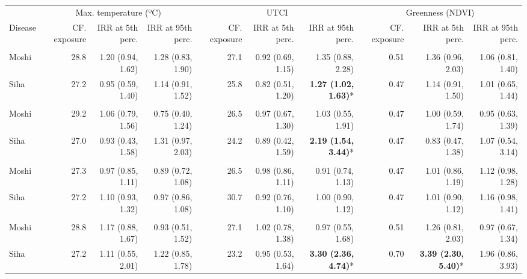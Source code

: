 \begin{table}[t]
\fontsize{12.0pt}{14.4pt}\selectfont
\begin{tabular*}{\linewidth}{@{\extracolsep{\fill}}l|rrrrrrrrr}
\toprule
 & \multicolumn{3}{c}{Max. temperature (ºC)} & \multicolumn{3}{c}{UTCI} & \multicolumn{3}{c}{Greenness (NDVI)} \\ 
\cmidrule(lr){2-4} \cmidrule(lr){5-7} \cmidrule(lr){8-10}
Disease & CF. exposure & IRR at 5th perc. & IRR at 95th perc. & CF. exposure & IRR at 5th perc. & IRR at 95th perc. & CF. exposure & IRR at 5th perc. & IRR at 95th perc. \\ 
\midrule\addlinespace[2.5pt]
\multicolumn{10}{l}{Pneumonia, Severe} \\[2.5pt] 
\midrule\addlinespace[2.5pt]
Moshi & 28.8 & 1.20 (0.94, 1.62) & 1.28 (0.83, 1.90) & 27.1 & 0.92 (0.69, 1.15) & 1.35 (0.88, 2.28) & 0.51 & 1.36 (0.96, 2.03) & 1.06 (0.81, 1.40) \\ 
Siha & 27.2 & 0.95 (0.59, 1.40) & 1.14 (0.91, 1.52) & 25.8 & 0.82 (0.51, 1.20) & \textbf{1.27 (1.02, 1.63)}* & 0.47 & 1.14 (0.91, 1.50) & 1.01 (0.65, 1.44) \\ 
\midrule\addlinespace[2.5pt]
\multicolumn{10}{l}{Tuberculosis} \\[2.5pt] 
\midrule\addlinespace[2.5pt]
Moshi & 29.2 & 1.06 (0.79, 1.56) & 0.75 (0.40, 1.24) & 26.5 & 0.97 (0.67, 1.30) & 1.03 (0.55, 1.91) & 0.47 & 1.00 (0.59, 1.74) & 0.95 (0.63, 1.39) \\ 
Siha & 27.0 & 0.93 (0.43, 1.58) & 1.31 (0.97, 2.03) & 24.2 & 0.89 (0.42, 1.59) & \textbf{2.19 (1.54, 3.44)}* & 0.47 & 0.83 (0.47, 1.38) & 1.07 (0.54, 3.14) \\ 
\midrule\addlinespace[2.5pt]
\multicolumn{10}{l}{Skin Infection - Fungal} \\[2.5pt] 
\midrule\addlinespace[2.5pt]
Moshi & 27.3 & 0.97 (0.85, 1.11) & 0.89 (0.72, 1.08) & 26.5 & 0.98 (0.86, 1.11) & 0.91 (0.74, 1.13) & 0.47 & 1.01 (0.86, 1.19) & 1.12 (0.98, 1.28) \\ 
Siha & 27.2 & 1.10 (0.93, 1.32) & 0.97 (0.86, 1.08) & 30.7 & 0.92 (0.76, 1.10) & 1.00 (0.90, 1.12) & 0.47 & 1.01 (0.90, 1.12) & 1.16 (0.98, 1.41) \\ 
\midrule\addlinespace[2.5pt]
\multicolumn{10}{l}{Malnutrition} \\[2.5pt] 
\midrule\addlinespace[2.5pt]
Moshi & 28.8 & 1.17 (0.88, 1.67) & 0.93 (0.51, 1.52) & 27.1 & 1.02 (0.78, 1.38) & 0.97 (0.55, 1.68) & 0.51 & 1.26 (0.81, 2.03) & 0.97 (0.67, 1.34) \\ 
Siha & 27.2 & 1.11 (0.55, 2.01) & 1.22 (0.85, 1.78) & 23.2 & 0.95 (0.53, 1.64) & \textbf{3.30 (2.36, 4.74)}* & 0.70 & \textbf{3.39 (2.30, 5.40)}* & 1.96 (0.86, 3.93) \\ 

\end{tabular*}
\end{table}
